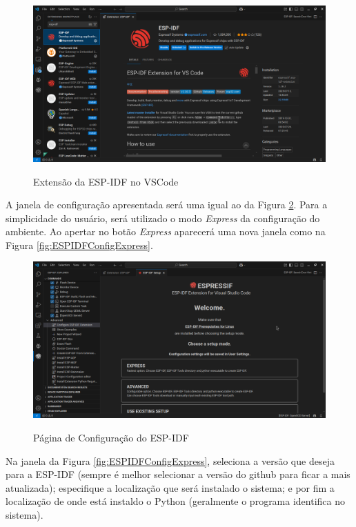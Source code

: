 \begin{figure}[!ht]
    \centering
    \caption{Extensão da ESP-IDF no VSCode}
    \vspace{0.2cm}
    \includegraphics[scale=0.2]{img/VSCodeESP-IDF.png}
    \label{fig:VSCodeESPIDF}
\end{figure}

A janela de configuração apresentada será uma igual ao da Figura
\ref{fig:ESPIDFConfig}. Para a simplicidade do usuário, será
utilizado o modo \textit{Express} da configuração do ambiente.
Ao apertar no botão \textit{Express} aparecerá uma nova janela
como na Figura \ref{fig:ESPIDFConfigExpress}.

\begin{figure}[!ht]
    \centering
    \caption{Página de Configuração do ESP-IDF}
    \vspace{0.2cm}
    \includegraphics[scale=0.2]{img/VSCodeESP-IDF_CONFIGURE.png}
    \label{fig:ESPIDFConfig}
\end{figure}

Na janela da Figura \ref{fig:ESPIDFConfigExpress}, seleciona a versão
que deseja para a ESP-IDF (sempre é melhor selecionar a versão do
github para ficar a mais atualizada); especifique a localização que
será instalado o sistema; e por fim a localização de onde está
instaldo o Python (geralmente o programa identifica no sistema).

